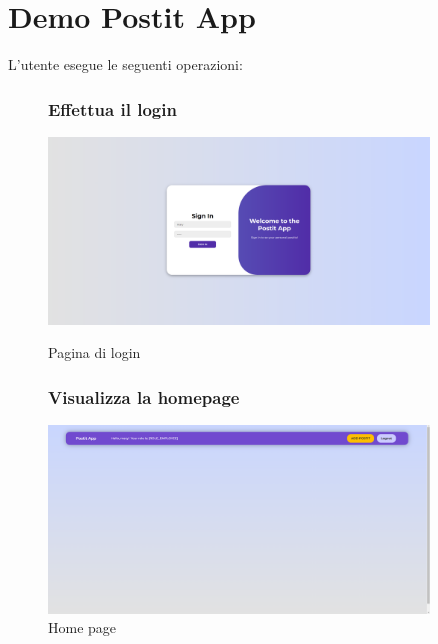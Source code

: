 \section{Demo Postit App}
L'utente esegue le seguenti operazioni:
\vspace*{\fill}
\begin{center}
    \begin{figure}[h]
        \centering
        \subsubsection{Effettua il login}
        \includegraphics[width=0.9\textwidth]{images/1 login.png}
        \caption{Pagina di login}
         \subsubsection{Visualizza la homepage}
        \includegraphics[width=0.9\textwidth]{images/2 homepage vuota.png}
        \caption{Home page}
        \label{fig:enter-label}
    \end{figure}
\end{center}
\vspace*{\fill}

\newpage

